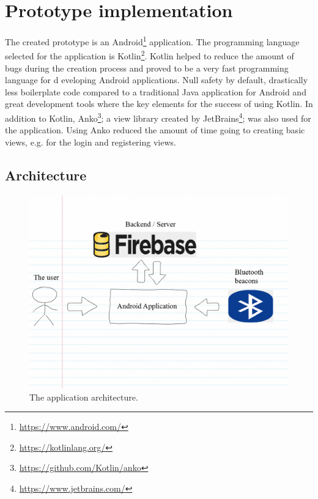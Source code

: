 \section{Prototype implementation}

The created prototype is an Android\footnote{\url{https://www.android.com/}} application. The programming language selected for the application is Kotlin\footnote{\url{https://kotlinlang.org/}}. Kotlin helped to reduce the amount of bugs during the creation process and proved to be a very fast programming language for d	eveloping Android applications. Null safety by default, drastically less boilerplate code compared to a traditional Java application for Android and great development tools where the key elements for the success of using Kotlin. In addition to Kotlin, Anko\footnote{\url{https://github.com/Kotlin/anko}}; a view library created by JetBrains\footnote{\url{https://www.jetbrains.com/}}; was also used for the application. Using Anko reduced the amount of time going to creating basic views, e.g. for the login and registering views.

\subsection{Architecture}


\begin{figure}[htb]
	\begin{center}
		\includegraphics[width=1\textwidth]{fs_architecture.png}
		\caption{The application architecture.}
		\label{fig:fs_architecture}
	\end{center}
\end{figure}

